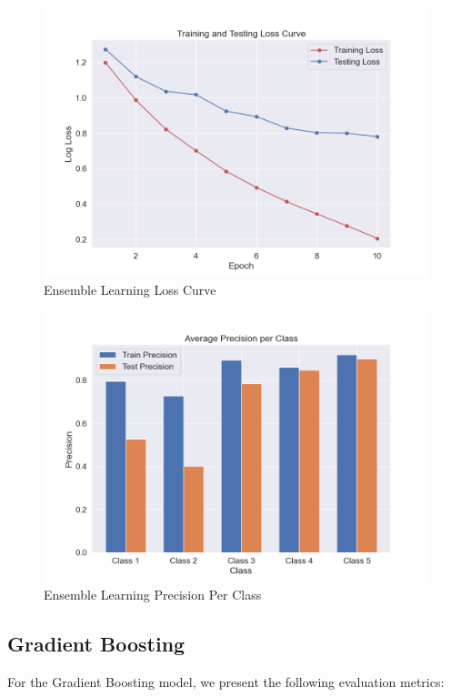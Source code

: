 \begin{figure}[H]
	\centering
	\includegraphics[width=\textwidth]{img/paper_1//loss_curve.png}
	\caption{Ensemble Learning Loss Curve}
\end{figure}

\begin{figure}[H]
	\centering
	\includegraphics[width=\textwidth]{img/paper_1//precision_per_class.png}
	\caption{Ensemble Learning Precision Per Class}
\end{figure}

\subsection{Gradient Boosting}

For the Gradient Boosting model, we present the following evaluation metrics:


